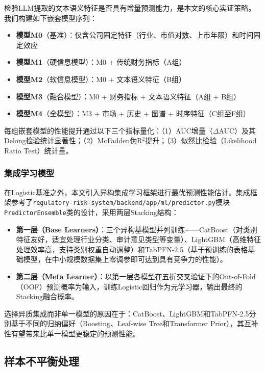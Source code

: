 检验LLM提取的文本语义特征是否具有增量预测能力，是本文的核心实证策略。我们构建如下嵌套模型序列：

\begin{itemize}[left=2em]
\item \textbf{模型M0}（基准）：仅含公司固定特征（行业、市值对数、上市年限）和时间固定效应
\item \textbf{模型M1}（硬信息模型）：M0 + 传统财务指标（A组）
\item \textbf{模型M2}（软信息模型）：M0 + 文本语义特征（B组）
\item \textbf{模型M3}（融合模型）：M0 + 财务指标 + 文本语义特征（A组 + B组）
\item \textbf{模型M4}（全模型）：M3 + 市场 + 历史 + 图谱 + 时序特征（C组至F组）
\end{itemize}

每组嵌套模型的性能提升通过以下三个指标量化：（1）AUC增量（$\Delta$AUC）及其Delong检验统计显著性；（2）McFadden伪R$^2$提升；（3）似然比检验（Likelihood Ratio Test）统计量。

\subsubsection{集成学习模型}

在Logistic基准之外，本文引入异构集成学习框架进行最优预测性能估计。集成框架参考了\texttt{regulatory-risk-system/backend/app/ml/predictor.py}模块\texttt{PredictorEnsemble}类的设计，采用两层Stacking结构：

\begin{itemize}[left=2em]
\item \textbf{第一层（Base Learners）}：三个异构基模型并列训练——CatBoost（对类别特征友好，适宜处理行业分类、审计意见类型等变量）、LightGBM（高维特征处理效率高，支持类别权重自动调整）和TabPFN-2.5（基于预训练的表格基础模型，在中小规模数据集上零调参即可达到具有竞争力的性能）。
\item \textbf{第二层（Meta Learner）}：以第一层各模型在五折交叉验证下的Out-of-Fold（OOF）预测概率为输入，训练Logistic回归作为元学习器，输出最终的Stacking融合概率。
\end{itemize}

选择异质集成而非单一模型的原因在于：CatBoost、LightGBM和TabPFN-2.5分别基于不同的归纳偏好（Boosting、Leaf-wise Tree和Transformer Prior），其互补性有望带来比单一模型更稳定的预测性能。

\subsection{样本不平衡处理}

